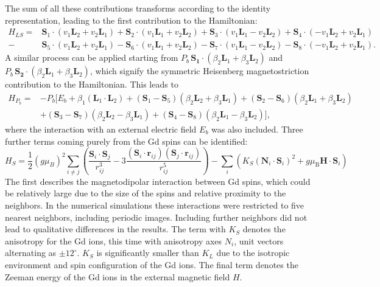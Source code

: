 The sum of all these contributions transforms according to the identity representation, leading to the first contribution to the Hamiltonian:
\begin{align}
    H_{LS} =& \mathbf{S}_1 \cdot (v_1 \mathbf{L}_2 + v_2 \mathbf{L}_1) + \mathbf{S}_2 \cdot (v_1 \mathbf{L}_1 + v_2 \mathbf{L}_2) + \mathbf{S}_3 \cdot (v_1 \mathbf{L}_1 - v_2 \mathbf{L}_2) + \mathbf{S}_4 \cdot (-v_1 \mathbf{L}_2 + v_2 \mathbf{L}_1) \nonumber\\
    -&\mathbf{S}_5 \cdot (v_1 \mathbf{L}_2 + v_2 \mathbf{L}_1) - \mathbf{S}_6 \cdot (v_1 \mathbf{L}_1 + v_2 \mathbf{L}_2) - \mathbf{S}_7 \cdot (v_1 \mathbf{L}_1 - v_2 \mathbf{L}_2) - \mathbf{S}_8 \cdot (-v_1 \mathbf{L}_2 + v_2 \mathbf{L}_1).
\end{align}
A similar process can be applied starting from $P_b \, \mathbf{S_1}\cdot(\beta_2 \mathbf{L}_1 + \beta_3 \mathbf{L}_2)$ and $P_b\, \mathbf{S_2}\cdot(\beta_2 \mathbf{L}_1 + \beta_3 \mathbf{L}_2)$, which signify the symmetric Heisenberg magnetostriction contribution to the Hamiltonian. This leads to
\begin{align}
	H_{P_b}=&-P_b[E_b + \beta_1 (\mathbf{L}_1\cdot \mathbf{L}_2)+
    (\mathbf{S}_1-\mathbf{S}_5)(\beta_2 \mathbf{L}_2 + \beta_3 \mathbf{L}_1) +
    (\mathbf{S}_2-\mathbf{S}_6)(\beta_2 \mathbf{L}_1 + \beta_3 \mathbf{L}_2) \nonumber\\ 
    &+(\mathbf{S}_3-\mathbf{S}_7)(\beta_2 \mathbf{L}_2 - \beta_3 \mathbf{L}_1) +
    (\mathbf{S}_4-\mathbf{S}_8)(\beta_2 \mathbf{L}_1 - \beta_3 \mathbf{L}_2)],
\end{align}
where the interaction with an external electric field $E_b$ was also included. 
Three further terms coming purely from the Gd spins can be identified:
\begin{equation}
     H_S=\frac{1}{2}(g \mu_B)^2\sum_{i\neq j}\left(\frac{\mathbf{S}_i\cdot \mathbf{S}_j}{r_{ij}^3}-3\frac{(\mathbf{S}_i\cdot \mathbf{r}_{ij})(\mathbf{S}_j\cdot \mathbf{r}_{ij})}{r_{ij}^5}\right) - \sum_i\left( K_S(\mathbf{N}_i\cdot \mathbf{S}_i)^2 + g\mu_\mathrm{B} \mathbf{H} \cdot \mathbf{S}_i\right) 
\end{equation}
The first describes the magnetodipolar interaction between Gd spins, which could be relatively large due to the size of the spins and relative proximity to the neighbors. In the numerical simulations these interactions were restricted to five nearest neighbors, including periodic images. Including further neighbors did not lead to qualitative differences in the results. The term with $K_S$ denotes the anisotropy for the Gd ions, this time with anisotropy axes $N_i$, unit vectors alternating as $\pm 12^\circ$. $K_S$ is significantly smaller than $K_L$ due to the isotropic environment and spin configuration of the Gd ions.
The final term denotes the Zeeman energy of the Gd ions in the external magnetic field $H$.

